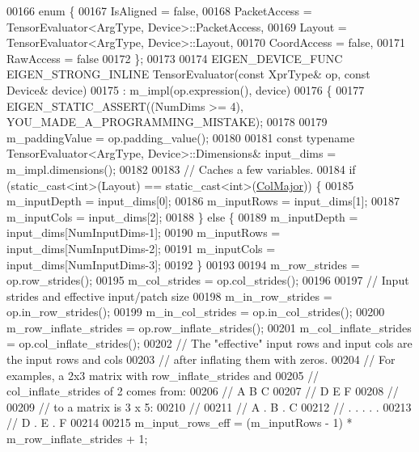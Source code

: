 \begin{DoxyCode}
00166   \textcolor{keyword}{enum} \{
00167     IsAligned = \textcolor{keyword}{false},
00168     PacketAccess = TensorEvaluator<ArgType, Device>::PacketAccess,
00169     Layout = TensorEvaluator<ArgType, Device>::Layout,
00170     CoordAccess = \textcolor{keyword}{false},
00171     RawAccess = \textcolor{keyword}{false}
00172   \};
00173 
00174   EIGEN\_DEVICE\_FUNC EIGEN\_STRONG\_INLINE TensorEvaluator(\textcolor{keyword}{const} XprType& op, \textcolor{keyword}{const} Device& device)
00175       : m\_impl(op.expression(), device)
00176   \{
00177     EIGEN\_STATIC\_ASSERT((NumDims >= 4), YOU\_MADE\_A\_PROGRAMMING\_MISTAKE);
00178 
00179     m\_paddingValue = op.padding\_value();
00180 
00181     \textcolor{keyword}{const} \textcolor{keyword}{typename} TensorEvaluator<ArgType, Device>::Dimensions& input\_dims = m\_impl.dimensions();
00182 
00183     \textcolor{comment}{// Caches a few variables.}
00184     \textcolor{keywordflow}{if} (static\_cast<int>(Layout) == static\_cast<int>(\hyperlink{group__enums_ggaacded1a18ae58b0f554751f6cdf9eb13a0cbd4bdd0abcfc0224c5fcb5e4f6669a}{ColMajor})) \{
00185       m\_inputDepth = input\_dims[0];
00186       m\_inputRows = input\_dims[1];
00187       m\_inputCols = input\_dims[2];
00188     \} \textcolor{keywordflow}{else} \{
00189       m\_inputDepth = input\_dims[NumInputDims-1];
00190       m\_inputRows = input\_dims[NumInputDims-2];
00191       m\_inputCols = input\_dims[NumInputDims-3];
00192     \}
00193 
00194     m\_row\_strides = op.row\_strides();
00195     m\_col\_strides = op.col\_strides();
00196 
00197     \textcolor{comment}{// Input strides and effective input/patch size}
00198     m\_in\_row\_strides = op.in\_row\_strides();
00199     m\_in\_col\_strides = op.in\_col\_strides();
00200     m\_row\_inflate\_strides = op.row\_inflate\_strides();
00201     m\_col\_inflate\_strides = op.col\_inflate\_strides();
00202     \textcolor{comment}{// The "effective" input rows and input cols are the input rows and cols}
00203     \textcolor{comment}{// after inflating them with zeros.}
00204     \textcolor{comment}{// For examples, a 2x3 matrix with row\_inflate\_strides and}
00205     \textcolor{comment}{// col\_inflate\_strides of 2 comes from:}
00206     \textcolor{comment}{//   A B C}
00207     \textcolor{comment}{//   D E F}
00208     \textcolor{comment}{//}
00209     \textcolor{comment}{// to a matrix is 3 x 5:}
00210     \textcolor{comment}{//}
00211     \textcolor{comment}{//   A . B . C}
00212     \textcolor{comment}{//   . . . . .}
00213     \textcolor{comment}{//   D . E . F}
00214 
00215     m\_input\_rows\_eff = (m\_inputRows - 1) * m\_row\_inflate\_strides + 1;

\end{DoxyCode}
